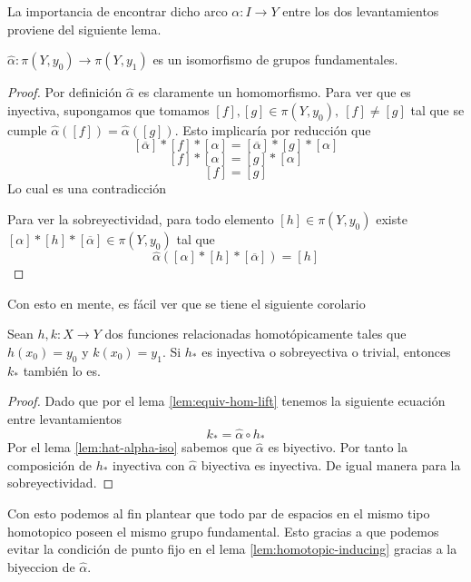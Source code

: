 La importancia de encontrar dicho arco \(\alpha : I \to Y\) entre los
dos levantamientos proviene del siguiente lema.
\begin{lema} \label{lem:hat-alpha-iso}
\(\hat \alpha : \pi (Y, y_0) \to \pi (Y, y_1)\) es un isomorfismo de
grupos fundamentales.
\end{lema}
\begin{proof}
  Por definición \(\hat \alpha\) es claramente un homomorfismo. Para ver
  que es inyectiva, supongamos que tomamos \([f],[g] \in \pi (Y, y_0),\
  [f] \neq [g]\) tal que se cumple \(\hat \alpha ([f]) = \hat \alpha
  ([g])\). Esto implicaría por reducción que
  \[ [\overline{\alpha}] * [f] * [\alpha] = [\overline{\alpha}] * [g] *
    [\alpha] \]
  \[ [f] * [\alpha] = [g] * [\alpha] \]
  \[ [f] = [g] \]
  Lo cual es una contradicción

  Para ver la sobreyectividad, para todo elemento \([h]
  \in \pi (Y,y_0)\) existe \( [\alpha] * [h] * [\overline{\alpha}] \in
  \pi (Y,y_0)\) tal que
  \[ \hat \alpha ([\alpha] * [h] * [\overline{\alpha}]) = [h]\]
\end{proof}
Con esto en mente, es fácil ver que se tiene el siguiente corolario
\begin{corolario}
  Sean \(h,k : X \to Y\) dos funciones relacionadas homotópicamente
  tales que \(h (x_0) = y_0\) y \(k(x_0) = y_1\). Si \(h_*\) es inyectiva
  o sobreyectiva o trivial, entonces \(k_*\) también lo es.
\end{corolario}
\begin{proof}
  Dado que por el lema \ref{lem:equiv-hom-lift} tenemos la siguiente
  ecuación entre levantamientos
  \[ k_* = \hat \alpha \circ h_* \]
  Por el lema \ref{lem:hat-alpha-iso} sabemos que \(\hat \alpha\) es
  biyectivo. Por tanto la composición de \(h_*\) inyectiva con \(\hat
  \alpha\) biyectiva es inyectiva. De igual manera para la
  sobreyectividad.
\end{proof}
Con esto podemos al fin plantear que todo par de espacios en el mismo
tipo homotopico poseen el mismo grupo fundamental. Esto gracias a que
podemos evitar la condición de punto fijo en el lema
\ref{lem:homotopic-inducing} gracias a la biyeccion de \(\hat \alpha\).

